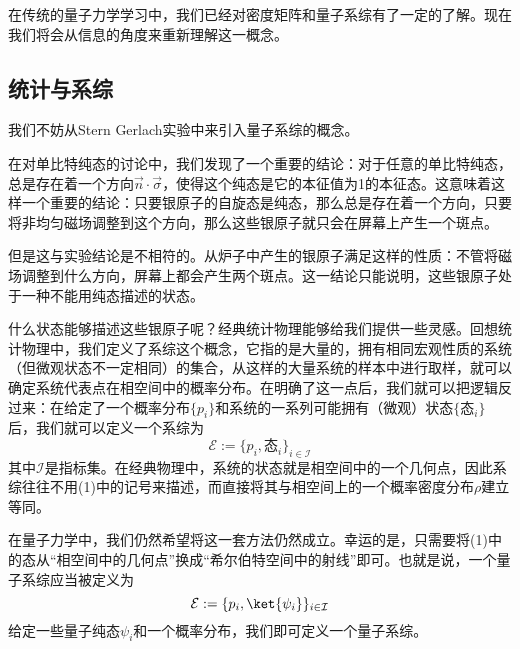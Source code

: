 
\begin{issues}
\issueDraft
\issueTODO
\end{issues}



在传统的量子力学学习中，我们已经对密度矩阵和量子系综有了一定的了解。现在我们将会从信息的角度来重新理解这一概念。

\subsection{统计与系综}

我们不妨从Stern Gerlach实验中来引入量子系综的概念。

在对单比特纯态的讨论中，我们发现了一个重要的结论：对于任意的单比特纯态，总是存在着一个方向$\vec{n}\cdot\vec{\sigma}$，使得这个纯态是它的本征值为1的本征态。这意味着这样一个重要的结论：只要银原子的自旋态是纯态，那么总是存在着一个方向，只要将非均匀磁场调整到这个方向，那么这些银原子就只会在屏幕上产生一个斑点。

但是这与实验结论是不相符的。从炉子中产生的银原子满足这样的性质：不管将磁场调整到什么方向，屏幕上都会产生两个斑点。这一结论只能说明，这些银原子处于一种不能用纯态描述的状态。

什么状态能够描述这些银原子呢？经典统计物理能够给我们提供一些灵感。回想统计物理中，我们定义了系综这个概念，它指的是大量的，拥有相同宏观性质的系统（但微观状态不一定相同）的集合，从这样的大量系统的样本中进行取样，就可以确定系统代表点在相空间中的概率分布。在明确了这一点后，我们就可以把逻辑反过来：在给定了一个概率分布$\{p_i\}$和系统的一系列可能拥有（微观）状态$\{\text{态}_i\}$后，我们就可以定义一个系综为
\begin{equation}
\mathcal{E}:=\{p_i, \text{态}_i\}_{i\in\mathcal{I}}
\end{equation}
其中$\mathcal{I}$是指标集。在经典物理中，系统的状态就是相空间中的一个几何点，因此系综往往不用(1)中的记号来描述，而直接将其与相空间上的一个概率密度分布$\rho$建立等同。

在量子力学中，我们仍然希望将这一套方法仍然成立。幸运的是，只需要将(1)中的态从“相空间中的几何点”换成“希尔伯特空间中的射线”即可。也就是说，一个量子系综应当被定义为
\begin{equation}
\mathcal{E}:=\{p_i,\ket{\psi_i}\}_{i\in\mathcal{I}}
\end{equation}给定一些量子纯态$\psi_i$和一个概率分布，我们即可定义一个量子系综。

